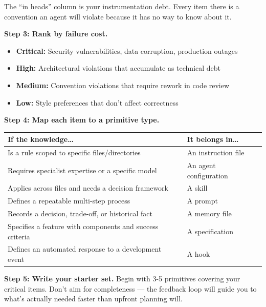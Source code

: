 \documentclass[
  a4paper,
  DIV=11,
  numbers=noendperiod]{scrreprt}
\newcounter{none} %
\providecommand{\tightlist}{%
  \setlength{\itemsep}{0pt}\setlength{\parskip}{0pt}}
\begin{document}
The ``in heads'' column is your instrumentation debt. Every item there
is a convention an agent will violate because it has no way to know
about it.

\textbf{Step 3: Rank by failure cost.}

\begin{itemize}
\tightlist
\item
  \textbf{Critical:} Security vulnerabilities, data corruption,
  production outages
\item
  \textbf{High:} Architectural violations that accumulate as technical
  debt
\item
  \textbf{Medium:} Convention violations that require rework in code
  review
\item
  \textbf{Low:} Style preferences that don't affect correctness
\end{itemize}

\textbf{Step 4: Map each item to a primitive type.}

{\def\LTcaptype{none} %
\begin{longtable}[]{@{}
  >{\raggedright\arraybackslash}p{}
  >{\raggedright\arraybackslash}p{}@{}}
\toprule\noalign{}
\begin{minipage}[b]{\linewidth}\raggedright
If the knowledge\ldots{}
\end{minipage} & \begin{minipage}[b]{\linewidth}\raggedright
It belongs in\ldots{}
\end{minipage} \\
\midrule\noalign{}
\endhead
\bottomrule\noalign{}
\endlastfoot
Is a rule scoped to specific files/directories & An instruction file \\
Requires specialist expertise or a specific model & An agent
configuration \\
Applies across files and needs a decision framework & A skill \\
Defines a repeatable multi-step process & A prompt \\
Records a decision, trade-off, or historical fact & A memory file \\
Specifies a feature with components and success criteria & A
specification \\
Defines an automated response to a development event & A hook \\
\end{longtable}
}

\textbf{Step 5: Write your starter set.} Begin with 3-5 primitives
covering your critical items. Don't aim for completeness --- the
feedback loop will guide you to what's actually needed faster than
upfront planning will.
\end{document}

